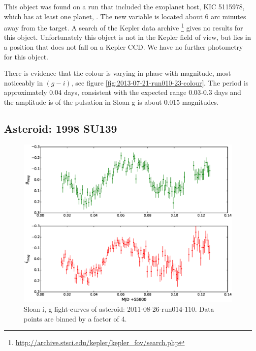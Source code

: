 
This object was found on a run that included the exoplanet host, KIC 5115978, which has at least one planet, \citep{KIC5115978}. The new variable is located about 6 arc minutes away from the target. A search of the Kepler data archive \footnote{\url{http://archive.stsci.edu/kepler/kepler_fov/search.php}} gives no results for this object. Unfortunately this object is not in the Kepler field of view, but lies in a position that does not fall on a Kepler CCD. We have no further photometry for this object. 

There is evidence that the colour is varying in phase with magnitude, most noticeably in $(g - i)$, see figure \ref{fig:2013-07-21-run010-23-colour}. The period is approximately 0.04 days, consistent with the expected range 0.03-0.3 days and the amplitude is of the pulsation in Sloan g is about 0.015 magnitudes.

\subsection{Asteroid: 1998 SU139}

\begin{figure}
  \center
  \includegraphics[width=140mm]{images/2011-08-26-run014-110-lightcurve-bin4.eps} 
  \caption{Sloan i, g light-curves of asteroid: 2011-08-26-run014-110. Data points are binned by a factor of 4.}
  \label{fig:2011-08-26-run014-110}
\end{figure}



